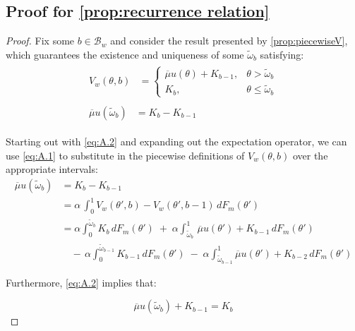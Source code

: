 \subsection{Proof for \autoref{prop:recurrence relation}} 
\begin{proof} 
Fix some $b\in\mathcal{B}_w$ and consider the result presented by \autoref{prop:piecewiseV}, which guarantees the existence and uniqueness of some $\widetilde \omega_b$ satisfying:
\begin{align}
    \begin{split}\label{eq:A.1}
        V_w(\theta, b)&=\begin{cases} 
            \overline\mu u(\theta) + K_{b-1},& \theta> \widetilde \omega_b \\
            K_b,& \theta\leq\widetilde \omega_b
        \end{cases}
    \end{split}\\ 
    \begin{split}\label{eq:A.2}
        \overline\mu u(\widetilde\omega_b) &= K_b-K_{b-1}
    \end{split} 
\end{align}  

Starting out with \autoref{eq:A.2} and expanding out the expectation operator, we can use \eqref{eq:A.1} to substitute in the piecewise definitions of $V_w(\theta,b)$ over the appropriate intervals: 
\begin{equation}\label{eq:A.3}
    \begin{split}
        \overline\mu u(\widetilde\omega_b) &= K_b-K_{b-1}\\
                                           &= \alpha \,\int^1_0 V_w(\theta',b)-V_w(\theta',b-1)\,dF_m(\theta')\\
                                           &=\alpha \int^{\widetilde\omega_b}_0 K_b\,dF_m(\theta') \;+\; \alpha \int^1_{\widetilde\omega_b}\,\overline\mu u(\theta') + K_{b-1}\,dF_m(\theta')\\ 
                                           & \quad -\,\alpha \int^{\widetilde\omega_{b-1}}_0 K_{b-1}\,dF_m(\theta') \;-\; \alpha \int^1_{\widetilde\omega_{b-1}} \overline\mu u(\theta') + K_{b-2}\,dF_m(\theta')
    \end{split}
\end{equation}

Furthermore, \autoref{eq:A.2} implies that:

$$
\overline\mu u(\widetilde\omega_b) +K_{b-1}= K_b
$$


\end{proof}
